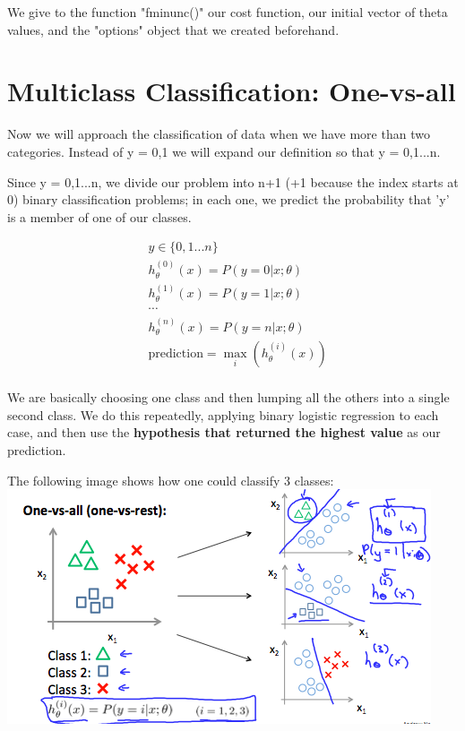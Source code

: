 \documentclass{article}
\begin{document}
We give to the function "fminunc()" our cost function, our initial vector of theta values, and the "options" object that we created beforehand.

\section{Multiclass Classification: One-vs-all}
Now we will approach the classification of data when we have more than two categories. Instead of y = {0,1} we will expand our definition so that y = {0,1...n}.

Since y = {0,1...n}, we divide our problem into n+1 (+1 because the index starts at 0) binary classification problems; in each one, we predict the probability that 'y' is a member of one of our classes.

\begin{align*}
	& y \in \lbrace0, 1 ... n\rbrace \\
	& h_\theta^{(0)}(x) = P(y = 0 | x ; \theta) \\
	& h_\theta^{(1)}(x) = P(y = 1 | x ; \theta) \\
	& \cdots \\
	& h_\theta^{(n)}(x) = P(y = n | x ; \theta) \\
	& \mathrm{prediction} = \max_i( h_\theta ^{(i)}(x) )\\
\end{align*}

We are basically choosing one class and then lumping all the others into a single second class. We do this repeatedly, applying binary logistic regression to each case, and then use the \textbf{hypothesis that returned the highest value} as our prediction.

The following image shows how one could classify 3 classes:\\
\includegraphics[width=\textwidth]{Multiclass_Classification_classify_3_classes}
\end{document}
